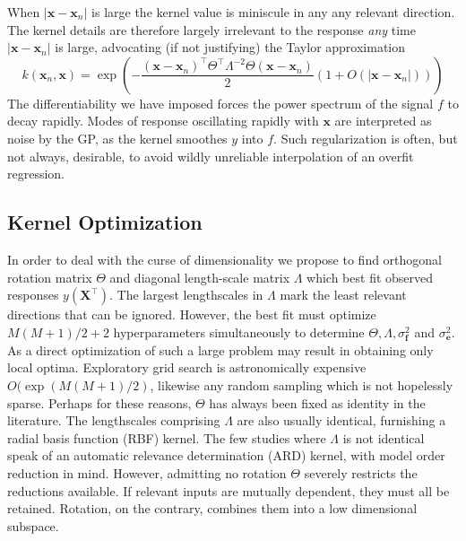 \documentclass[preprint,12pt]{elsarticle}
\newcommand*{\M}[1]{\ensuremath{#1}\xspace}
\newcommand*{\vr}[1]{\M{\mathbf{#1}}}
\newcommand*{\modulus}[1]{\M{\left\lvert#1\right\rvert}}
\begin{document}
            When $\modulus{\vr{x}-\vr{x}_{n}}$ is large the kernel value is miniscule in any any relevant direction. The kernel details are therefore largely irrelevant to the response \emph{any} time $\modulus{\vr{x}-\vr{x}_{n}}$ is large, advocating (if not justifying) the Taylor approximation
            \begin{equation*}
                k(\vr{x}_{n},\vr{x}) = 
                \exp \left(-\frac
                    {(\vr{x}-\vr{x}_{n})^{\intercal} \Theta^{\intercal}\Lambda^{-2}\Theta (\vr{x}-\vr{x}_{n})}{2}
                    \left(1+O(\modulus{\vr{x}-\vr{x}_{n}})\right)
                \right)             
            \end{equation*}
            The differentiability we have imposed forces the power spectrum of the signal $f$ to decay rapidly. 
            Modes of response oscillating rapidly with $\vr{x}$ are interpreted as noise by the GP, as the kernel smoothes $y$ into $f$. Such regularization is often, but not always, desirable, to avoid wildly unreliable interpolation of an overfit regression.

        \subsection{Kernel Optimization}
            In order to deal with the curse of dimensionality we propose to find orthogonal rotation matrix $\Theta$ and diagonal length-scale matrix $\Lambda$ which best fit observed responses $y(\vr{X}^{\intercal})$. The largest lengthscales in $\Lambda$ mark the least relevant directions that can be ignored. However, the best fit must optimize $M(M+1)/2+2$ hyperparameters simultaneously to determine $\Theta, \Lambda, \sigma^{2}_\vr{f}$ and $\sigma^{2}_\vr{e}$. As a direct optimization of such a large problem may result in obtaining only local optima. Exploratory grid search is astronomically expensive $O(\exp(M(M+1)/2)$, likewise any random sampling which is not hopelessly sparse. Perhaps for these reasons, $\Theta$ has always been fixed as identity in the literature. The lengthscales comprising $\Lambda$ are also usually identical, furnishing a radial basis function (RBF) kernel. The few studies where $\Lambda$ is not identical speak of an automatic relevance determination (ARD) kernel, with model order reduction in mind. However, admitting no rotation $\Theta$ severely restricts the reductions available. If relevant inputs are mutually dependent, they must all be retained. Rotation, on the contrary, combines them into a low dimensional subspace.
\end{document}
